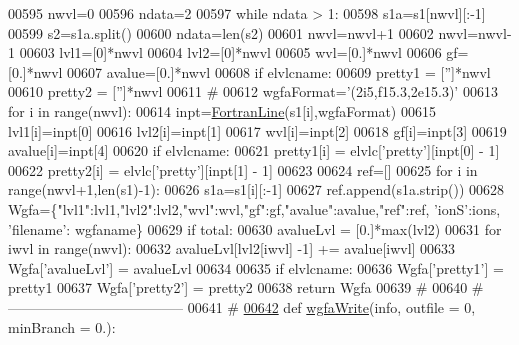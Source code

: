 \begin{DoxyCode}
{{{{{{{{{00595 \textcolor{stringliteral}{    nwvl=0}
00596 \textcolor{stringliteral}{    ndata=2}
00597 \textcolor{stringliteral}{    }\textcolor{keywordflow}{while} ndata > 1:
00598         s1a=s1[nwvl][:-1]
00599         s2=s1a.split()
00600         ndata=len(s2)
00601         nwvl=nwvl+1
00602     nwvl=nwvl-1
00603     lvl1=[0]*nwvl
00604     lvl2=[0]*nwvl
00605     wvl=[0.]*nwvl
00606     gf=[0.]*nwvl
00607     avalue=[0.]*nwvl
00608     \textcolor{keywordflow}{if} elvlcname:
00609         pretty1 = [\textcolor{stringliteral}{''}]*nwvl
00610         pretty2 = [\textcolor{stringliteral}{''}]*nwvl
00611     \textcolor{comment}{#}
00612     wgfaFormat=\textcolor{stringliteral}{'(2i5,f15.3,2e15.3)'}
00613     \textcolor{keywordflow}{for} i \textcolor{keywordflow}{in} range(nwvl):
00614         inpt=\hyperlink{classpyneb_1_1utils_1_1_fortran_format_1_1_fortran_line}{FortranLine}(s1[i],wgfaFormat)
00615         lvl1[i]=inpt[0]
00616         lvl2[i]=inpt[1]
00617         wvl[i]=inpt[2]
00618         gf[i]=inpt[3]
00619         avalue[i]=inpt[4]
00620         \textcolor{keywordflow}{if} elvlcname:
00621             pretty1[i] = elvlc[\textcolor{stringliteral}{'pretty'}][inpt[0] - 1]
00622             pretty2[i] = elvlc[\textcolor{stringliteral}{'pretty'}][inpt[1] - 1]
00623 
00624     ref=[]
00625     \textcolor{keywordflow}{for} i \textcolor{keywordflow}{in} range(nwvl+1,len(s1)-1):
00626         s1a=s1[i][:-1]
00627         ref.append(s1a.strip())
00628     Wgfa=\{\textcolor{stringliteral}{"lvl1"}:lvl1,\textcolor{stringliteral}{"lvl2"}:lvl2,\textcolor{stringliteral}{"wvl"}:wvl,\textcolor{stringliteral}{"gf"}:gf,\textcolor{stringliteral}{"avalue"}:avalue,\textcolor{stringliteral}{"ref"}:ref, \textcolor{stringliteral}{'ionS'}:ions, \textcolor{stringliteral}{'filename'}:
      wgfaname\}
00629     \textcolor{keywordflow}{if} total:
00630         avalueLvl = [0.]*max(lvl2)
00631         \textcolor{keywordflow}{for} iwvl \textcolor{keywordflow}{in} range(nwvl):
00632             avalueLvl[lvl2[iwvl] -1] += avalue[iwvl]
00633         Wgfa[\textcolor{stringliteral}{'avalueLvl'}] = avalueLvl
00634 
00635     \textcolor{keywordflow}{if} elvlcname:
00636         Wgfa[\textcolor{stringliteral}{'pretty1'}] = pretty1
00637         Wgfa[\textcolor{stringliteral}{'pretty2'}] = pretty2
00638     \textcolor{keywordflow}{return} Wgfa
00639     \textcolor{comment}{#}
00640     \textcolor{comment}{# --------------------------------------}
00641     \textcolor{comment}{#}
\hypertarget{__chianti__tools_8py_source_l00642}{}\hyperlink{namespacepyneb_1_1utils_1_1__chianti__tools_a300c13ee6815450bc20d25a2c6dcb8a8}{00642} \textcolor{keyword}{def }\hyperlink{namespacepyneb_1_1utils_1_1__chianti__tools_a300c13ee6815450bc20d25a2c6dcb8a8}{wgfaWrite}(info, outfile = 0, minBranch = 0.):
}}}}}}}}}
\end{DoxyCode}
